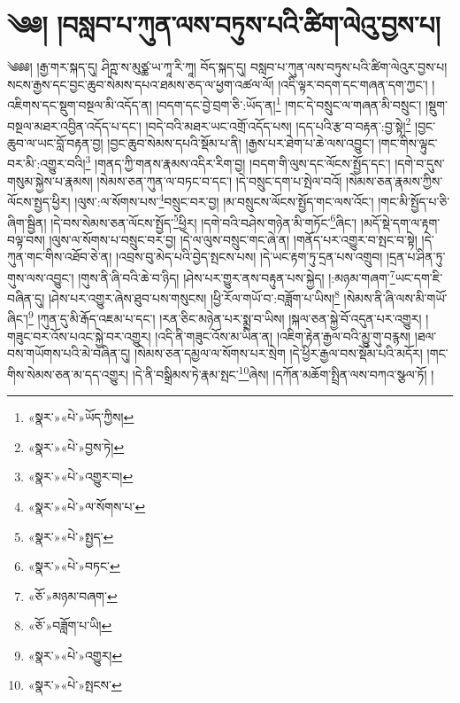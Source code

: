 \chapter{༄༅། །བསླབ་པ་ཀུན་ལས་བཏུས་པའི་ཚིག་ལེའུ་བྱས་པ།}༄༅༅། །རྒྱ་གར་སྐད་དུ། ཤིཀྵ་ས་མུཙྪ་ཡ་ཀཱ་རི་ཀཱ། བོད་སྐད་དུ། བསླབ་པ་ཀུན་ལས་བཏུས་པའི་ཚིག་ལེའུར་བྱས་པ། སངས་རྒྱས་དང་བྱང་ཆུབ་སེམས་དཔའ་ཐམས་ཅད་ལ་ཕྱག་འཚལ་ལོ། །འདི་ལྟར་བདག་དང་གཞན་དག་ཀྱང་། །འཇིགས་དང་སྡུག་བསྔལ་མི་འདོད་ན། །བདག་དང་བྱེ་བྲག་ཅི་:ཡོད་ན།\footnote{«སྣར་»«པེ་»ཡོད་ཀྱིས།} །གང་དེ་བསྲུང་ལ་གཞན་མི་བསྲུང་། །སྡུག་བསྔལ་མཐར་འབྱིན་འདོད་པ་དང་། །བདེ་བའི་མཐར་ཡང་འགྲོ་འདོད་པས། །དད་པའི་རྩ་བ་བརྟན་:བྱ་སྟེ།\footnote{«སྣར་»«པེ་»བྱས་ཏེ།} །བྱང་ཆུབ་ལ་ཡང་བློ་བརྟན་བྱ། །བྱང་ཆུབ་སེམས་དཔའི་སྡོམ་པ་ནི། །རྒྱས་པར་ཐེག་པ་ཆེ་ལས་འབྱུང་། །གང་གིས་ལྟུང་བར་མི་:འགྱུར་བའི།\footnote{«སྣར་»«པེ་»འགྱུར་བ།} །གནད་ཀྱི་གནས་རྣམས་འདིར་རིག་བྱ། །བདག་གི་ལུས་དང་ལོངས་སྤྱོད་དང་། །དགེ་བ་དུས་གསུམ་སྐྱེས་པ་རྣམས། །སེམས་ཅན་ཀུན་ལ་བཏང་བ་དང་། །དེ་བསྲུང་དག་པ་སྤེལ་བའོ། །སེམས་ཅན་རྣམས་ཀྱིས་ལོངས་སྤྱད་ཕྱིར། །ལུས་:ལ་སོགས་པས་\footnote{«སྣར་»«པེ་»ལ་སོགས་པ་}བསྲུང་བར་བྱ། །མ་བསྲུངས་ལོངས་སྤྱོད་གང་ལས་འོང་། །གང་མི་སྤྱོད་པ་ཅི་ཞིག་སྦྱིན། །དེ་བས་སེམས་ཅན་ལོངས་སྤྱོད་\footnote{«སྣར་»«པེ་»སྤྱད་}ཕྱིར། །དགེ་བའི་བཤེས་གཉེན་མི་གཏོང་\footnote{«སྣར་»«པེ་»བཏང་}ཞིང་། །མདོ་སྡེ་དག་ལ་རྟག་བལྟ་བས། །ལུས་ལ་སོགས་པ་བསྲུང་བར་བྱ། །དེ་ལ་ལུས་བསྲུང་གང་ཞེ་ན། །གནོད་པར་འགྱུར་བ་སྤང་བ་སྟེ། །དེ་ཀུན་གང་གིས་འཐོབ་ཅེ་ན། །འབྲས་བུ་མེད་པའི་བྱེད་སྤངས་པས། །དེ་ཡང་རྟག་ཏུ་དྲན་པས་འགྲུབ། །དྲན་པ་ཤིན་ཏུ་གུས་ལས་འབྱུང་། །གུས་ནི་ཞི་བའི་ཆེ་བ་ཉིད། །ཤེས་པར་གྱུར་ནས་བརྟུན་པས་སྐྱེད། །:མཉམ་གཞག་\footnote{«ཅོ་»མཉམ་བཞག་}ཡང་དག་ཇི་བཞིན་དུ། །ཤེས་པར་འགྱུར་ཞེས་ཐུབ་པས་གསུངས། །ཕྱི་རོལ་གཡོ་བ་:བཟློག་པ་ཡིས།\footnote{«ཅོ་»བཟློག་པ་ཡི།} །སེམས་ནི་ཞི་ལས་མི་གཡོ་ཞིང་།\footnote{«སྣར་»«པེ་»འགྱུར།} །ཀུན་དུ་མི་རྒོད་འཇམ་པ་དང་། །རན་ཅིང་མཉེན་པར་སྨྲ་བ་ཡིས། །སྐལ་ཅན་སྐྱེ་བོ་འདུན་པར་འགྱུར། །གཟུང་བར་འོས་པའང་སྐྱེ་བར་འགྱུར། །འདི་ནི་གཟུང་འོས་མ་ཡིན་ན། །འཇིག་རྟེན་རྒྱལ་བའི་མྱུ་གུ་བརྙས། །ཐལ་བས་གཡོགས་པའི་མེ་བཞིན་དུ། །སེམས་ཅན་དམྱལ་ལ་སོགས་པར་སྲེག །དེ་ཕྱིར་རྒྱལ་བས་སྡོམ་པའི་མདོར། །གང་གིས་སེམས་ཅན་མ་དད་འགྱུར། །དེ་ནི་བསྒྲིམས་ཏེ་རྣམ་སྤང་\footnote{«སྣར་»«པེ་»སྤངས་}ཞེས། །དཀོན་མཆོག་སྤྲིན་ལས་བཀའ་སྩལ་ཏོ། །
